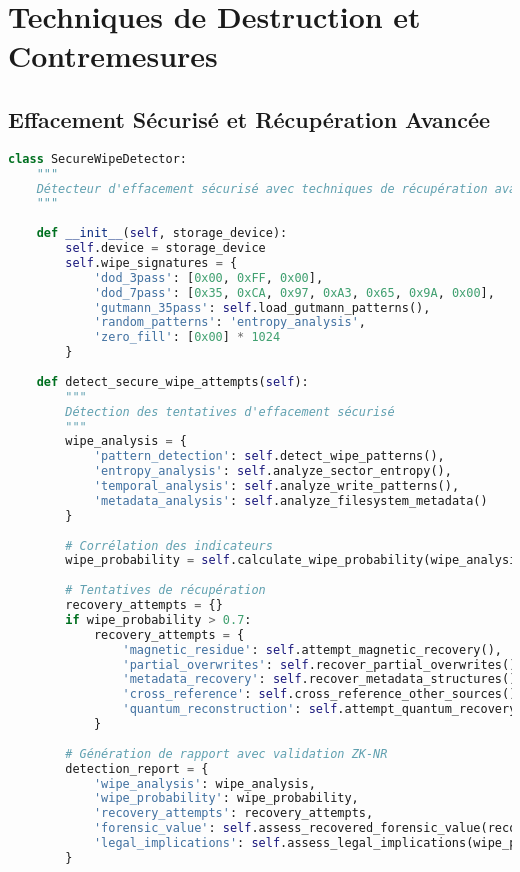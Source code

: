 \section{Techniques de Destruction et Contremesures}

\subsection{Effacement Sécurisé et Récupération Avancée}

\begin{lstlisting}[language=Python, caption=Détecteur d'effacement sécurisé et techniques de récupération]
class SecureWipeDetector:
    """
    Détecteur d'effacement sécurisé avec techniques de récupération avancées
    """
    
    def __init__(self, storage_device):
        self.device = storage_device
        self.wipe_signatures = {
            'dod_3pass': [0x00, 0xFF, 0x00],
            'dod_7pass': [0x35, 0xCA, 0x97, 0xA3, 0x65, 0x9A, 0x00],
            'gutmann_35pass': self.load_gutmann_patterns(),
            'random_patterns': 'entropy_analysis',
            'zero_fill': [0x00] * 1024
        }
        
    def detect_secure_wipe_attempts(self):
        """
        Détection des tentatives d'effacement sécurisé
        """
        wipe_analysis = {
            'pattern_detection': self.detect_wipe_patterns(),
            'entropy_analysis': self.analyze_sector_entropy(),
            'temporal_analysis': self.analyze_write_patterns(),
            'metadata_analysis': self.analyze_filesystem_metadata()
        }
        
        # Corrélation des indicateurs
        wipe_probability = self.calculate_wipe_probability(wipe_analysis)
        
        # Tentatives de récupération
        recovery_attempts = {}
        if wipe_probability > 0.7:
            recovery_attempts = {
                'magnetic_residue': self.attempt_magnetic_recovery(),
                'partial_overwrites': self.recover_partial_overwrites(),
                'metadata_recovery': self.recover_metadata_structures(),
                'cross_reference': self.cross_reference_other_sources(),
                'quantum_reconstruction': self.attempt_quantum_recovery()
            }
            
        # Génération de rapport avec validation ZK-NR
        detection_report = {
            'wipe_analysis': wipe_analysis,
            'wipe_probability': wipe_probability,
            'recovery_attempts': recovery_attempts,
            'forensic_value': self.assess_recovered_forensic_value(recovery_attempts),
            'legal_implications': self.assess_legal_implications(wipe_probability)
        }
        

\end{lstlisting}
